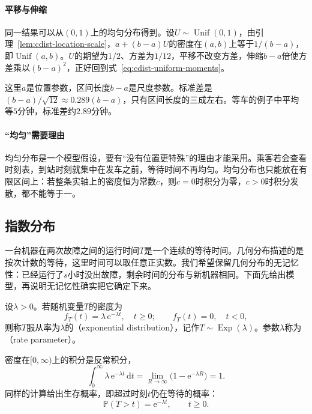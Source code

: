 \paragraph{平移与伸缩}
同一结果可以从$(0,1)$上的均匀分布得到。设$U\sim\operatorname{Unif}(0,1)$，由引理~\ref{lem:cdist-location-scale}，$a+(b-a)U$的密度在$(a,b)$上等于$1/(b-a)$，即$\operatorname{Unif}(a,b)$。$U$的期望为$1/2$、方差为$1/12$，平移不改变方差，伸缩$b-a$倍使方差乘以$(b-a)^{2}$，正好回到式~\eqref{eq:cdist-uniform-moments}。

这里$a$是位置参数，区间长度$b-a$是尺度参数。标准差是$(b-a)/\sqrt{12}\approx0.289(b-a)$，只有区间长度的三成左右。等车的例子中平均等$5$分钟，标准差约$2.89$分钟。

\paragraph{“均匀”需要理由}
均匀分布是一个模型假设，要有“没有位置更特殊”的理由才能采用。乘客若会查看时刻表，到站时刻就集中在发车之前，等待时间不再均匀。均匀分布也只能放在有限区间上：若整条实轴上的密度恒为常数$c$，则$c=0$时积分为零，$c>0$时积分发散，都不能等于一。

\subsection{指数分布}
\label{sec:cdist-exponential}

一台机器在两次故障之间的运行时间$T$是一个连续的等待时间。几何分布描述的是按次计数的等待，这里时间可以取任意正实数。我们希望保留几何分布的无记忆性：已经运行了$s$小时没出故障，剩余时间的分布与新机器相同。下面先给出模型，再说明无记忆性确实把它确定下来。

\begin{definition}[指数分布]
\label{def:cdist-exponential}
设$\lambda>0$。若随机变量$T$的密度为
\begin{equation}
  f_T(t)=\lambda\,\mathrm{e}^{-\lambda t},\quad t\geq0;\qquad f_T(t)=0,\quad t<0,
  \label{eq:cdist-exponential-density}
\end{equation}
则称$T$服从率为$\lambda$的（exponential distribution），记作$T\sim\operatorname{Exp}(\lambda)$。参数$\lambda$称为（rate parameter）。
\end{definition}

密度在$[0,\infty)$上的积分是反常积分，
\[
  \int_0^{\infty}\lambda\,\mathrm{e}^{-\lambda t}\,\mathrm{d}t=\lim_{R\to\infty}\bigl(1-\mathrm{e}^{-\lambda R}\bigr)=1 .
\]
同样的计算给出生存概率，即超过时刻$t$仍在等待的概率：
\begin{equation}
  \mathbb{P}(T>t)=\mathrm{e}^{-\lambda t},\qquad t\geq0 .
  \label{eq:cdist-exponential-survival}
\end{equation}

